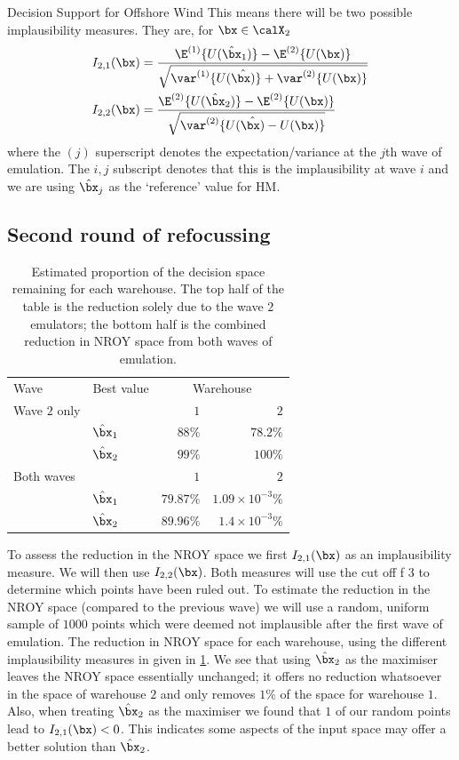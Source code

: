 \begin{chapter}{Decision Support for Offshore Wind \label{Ch:ds-for-ow}}
This means there will be two possible implausibility measures. They are, for $\bx \in \calX_2$
\begin{align}
  I_{2,1}(\bx) &= \frac{\E^{(1)}\{U(\hat{\bx}_1)\} - \E^{(2)} \{U(\bx)\} }{\sqrt{\var^{(1)} \{U(\hat{\bx)} \} + \var^{(2)}\{U(\bx)\}  }}\\
  I_{2,2}(\bx) &= \frac{\E^{(2)}\{U(\hat{\bx}_2)\} - \E^{(2)} \{U(\bx)\} }{\sqrt{\var^{(2)} \{U(\hat{\bx)} - U(\bx)\}  }}
\end{align}
where the $(j)$ superscript denotes the expectation/variance at the $j$th wave of emulation.  The $i,j$ subscript denotes that this is the implausibility at wave $i$ and we are using $\hat{\bx}_j$ as the `reference' value for HM.

\subsection{Second round of refocussing}
\begin{table}
	\centering
	\begin{tabular}{llrr}
		\toprule
    Wave & Best value & \multicolumn{2}{c}{Warehouse} \\\cmidrule{1-4}
    Wave $2$ only& & $1$  & $2$ \\
    &$\hat{\bx}_1$ & $88\%$ & $78.2\%$ \\
    &$\hat{\bx}_2$ & $99\%$ & $100\%$\\\cmidrule{1-4}
    Both waves& & $1$  & $2$ \\
    &$\hat{\bx}_1$ & $79.87\%$ & $1.09\times10^{-3}\%$ \\
    &$\hat{\bx}_2$ & $89.96\%$ & $1.4\times10^{-3}\%$ \\\bottomrule
	\end{tabular}
	\caption{Estimated proportion of the decision space remaining for each warehouse. The top half of the table is the reduction solely due to the wave $2$ emulators; the bottom half is the combined reduction in NROY space from both waves of emulation. \label{Tab:compare-nroy}}
\end{table}
To assess the reduction in the NROY space we first $I_{2,1}(\bx)$ as an implausibility measure. We will then use $I_{2,2}(\bx)$. Both measures will use the cut off f  $3$ to determine which points have been ruled out. To estimate the reduction in the NROY space (compared to the previous wave) we will use a random, uniform sample of $1000$ points which were deemed not implausible after the first wave of emulation. The reduction in NROY space for each warehouse, using the different implausibility measures in given in  \cref{Tab:compare-nroy}.  We see that using $\hat{\bx}_2$ as the maximiser leaves the NROY space essentially unchanged; it offers no reduction whatsoever in the space of warehouse $2$ and only removes $1\%$ of the space for warehouse $1$. Also, when treating $\hat{\bx}_2$ as the maximiser we found that $1$ of our random points lead to $I_{2,1}(\bx) < 0$. This indicates some aspects of the input space may offer a better solution than $\hat{\bx}_2$.


\end{chapter}
